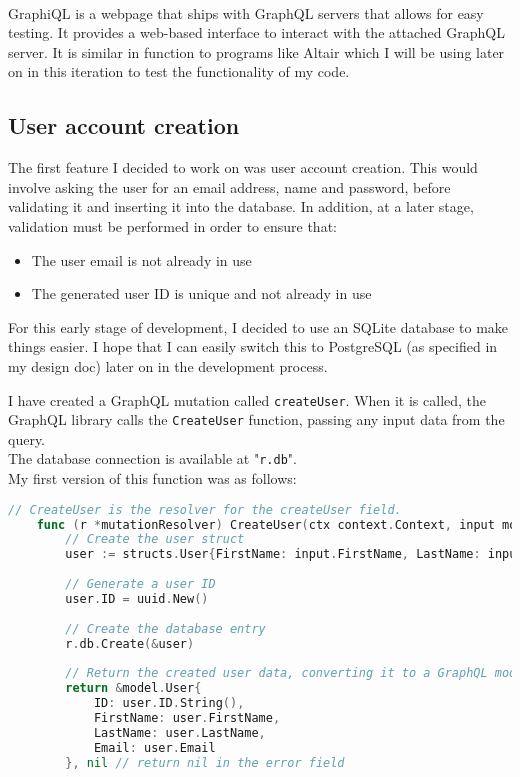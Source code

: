 \documentclass[../../main.tex]{subfiles}
\begin{document}
\noindent \\ GraphiQL is a webpage that ships with GraphQL servers that allows for easy testing. It provides a web-based interface to interact with the attached GraphQL server. It is similar in function to programs like Altair which I will be using later on in this iteration to test the functionality of my code.

\subsection{User account creation}

The first feature I decided to work on was user account creation. This would involve asking the user for an email address, name and password, before validating it and inserting it into the database.
In addition, at a later stage, validation must be performed in order to ensure that:

\begin{itemize}
    \item The user email is not already in use
    \item The generated user ID is unique and not already in use
\end{itemize}

\noindent For this early stage of development, I decided to use an SQLite database to make things easier. I hope that I can easily switch this to PostgreSQL (as specified in my design doc) later on in the development process.

\noindent I have created a GraphQL mutation called \lstinline{createUser}. When it is called, the GraphQL library calls the \lstinline{CreateUser} function, passing any input data from the query.\\ The database connection is available at "\lstinline{r.db}".\\

\noindent My first version of this function was as follows:

\begin{lstlisting}[language=Go]
    // CreateUser is the resolver for the createUser field.
    func (r *mutationResolver) CreateUser(ctx context.Context, input model.NewUser) (*model.User, error) {
        // Create the user struct
        user := structs.User{FirstName: input.FirstName, LastName: input.LastName, Email: input.Email}
        
        // Generate a user ID
        user.ID = uuid.New()
    
        // Create the database entry
        r.db.Create(&user)
    
        // Return the created user data, converting it to a GraphQL model.
        return &model.User{
            ID: user.ID.String(),
            FirstName: user.FirstName,
            LastName: user.LastName,
            Email: user.Email
        }, nil // return nil in the error field
    \end{lstlisting}
\end{document}
